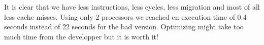 \documentclass[a4paper, 10 pt, conference]{ieeeconf}
\begin{document}
It is clear that we have less instructions, less cycles, less migration and most of all less cache misses. Using only 2 processors we reached en execution time of 0.4 seconds instead of 22 seconds for the bad version. Optimizing might take too much time from the developper but it is worth it!

\nocite{*}
%
\end{document}
